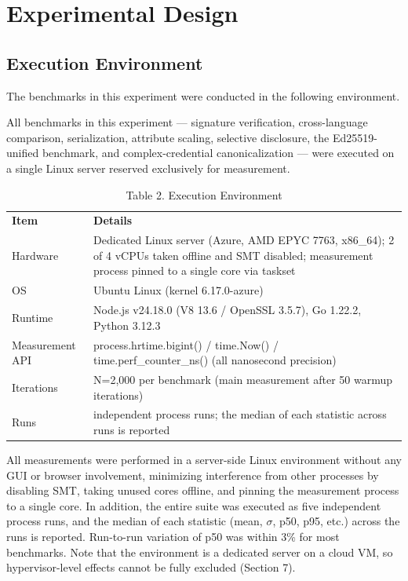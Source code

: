 \documentclass[conference]{IEEEtran}
\begin{document}
\section{Experimental Design}

\subsection{Execution Environment}

The benchmarks in this experiment were conducted in the following environment.

All benchmarks in this experiment --- signature verification, cross-language comparison, serialization, attribute scaling, selective disclosure, the Ed25519-unified benchmark, and complex-credential canonicalization --- were executed on a single Linux server reserved exclusively for measurement.


\begin{table}[!t]
\centering
\caption{Table 2. Execution Environment}\label{tab:2}
\footnotesize
\begin{tabular}{l>{\raggedright\arraybackslash}p{}}
\toprule

\textbf{Item} & \textbf{Details}\tabularnewline
Hardware & Dedicated Linux server (Azure, AMD EPYC 7763, x86\_64); 2 of 4 vCPUs taken offline and SMT disabled; measurement process pinned to a single core via taskset\tabularnewline
OS & Ubuntu Linux (kernel 6.17.0-azure)\tabularnewline
Runtime & Node.js v24.18.0 (V8 13.6 / OpenSSL 3.5.7), Go 1.22.2, Python 3.12.3\tabularnewline
Measurement API & process.hrtime.bigint() / time.Now() / time.perf\_counter\_ns() (all nanosecond precision)\tabularnewline
Iterations & N=2,000 per benchmark (main measurement after 50 warmup iterations)\tabularnewline
Runs & 5 independent process runs; the median of each statistic across runs is reported\tabularnewline
\bottomrule
\end{tabular}
\end{table}

All measurements were performed in a server-side Linux environment without any GUI or browser involvement, minimizing interference from other processes by disabling SMT, taking unused cores offline, and pinning the measurement process to a single core. In addition, the entire suite was executed as five independent process runs, and the median of each statistic (mean, $\sigma$, p50, p95, etc.) across the runs is reported. Run-to-run variation of p50 was within 3\% for most benchmarks. Note that the environment is a dedicated server on a cloud VM, so hypervisor-level effects cannot be fully excluded (Section 7).
\end{document}
